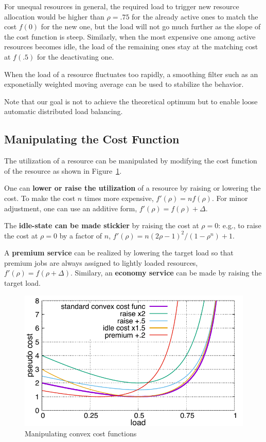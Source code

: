 For unequal resources in general, the required load to trigger new
resource allocation would be higher than $\rho = .75$ for the already
active ones to match the cost $f(0)$ for the new one, but the load
will not go much further as the slope of the cost function is steep.
Similarly, when the most expensive one among active resources becomes
idle, the load of the remaining ones stay at the matching cost at
$f(.5)$ for the deactivating one.

When the load of a resource fluctuates too rapidly,
a smoothing filter such as an exponetially weighted moving average
can be used to stabilize the behavior.

Note that our goal is not to achieve the theoretical optimum but to
enable loose automatic distributed load balancing.

\subsection{Manipulating the Cost Function}
\label{sec:variation}

The utilization of a resource can be manipulated by modifying the cost
function of the resource as shown in Figure~\ref{fig:costfunc3}.

One can {\bf lower or raise the utilization} of a resource by raising or
lowering the cost.
To make the cost $n$ times more expensive, $f'(\rho) = n f(\rho)$.
For minor adjustment, one can use an additive form,
$f'(\rho) = f(\rho) + \Delta$.

The {\bf idle-state can be made stickier} by raising the cost at $\rho = 0$:
e.g., to raise the cost at $\rho = 0$ by a factor of $n$,
$f'(\rho) = n (2\rho - 1)^{2}/(1 - \rho^{n}) + 1$.

A {\bf premium service} can be realized by lowering the target load so
that premium jobs are always assigned to lightly loaded resources, 
$f'(\rho) = f(\rho + \Delta)$.
Similary, an {\bf economy service} can be made by raising the target
load.

\begin{figure}[tb]
  \begin{center}
    \includegraphics[width=1.0\columnwidth]{costfunc3.pdf}
    \vspace{-2.0ex}
    \caption{Manipulating convex cost functions}
    \label{fig:costfunc3}
  \end{center}
\end{figure}



